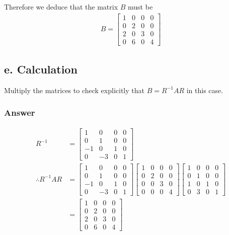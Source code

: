\documentclass{article}
\begin{document}
		Therefore we deduce that the matrix $B$ must be 
		\begin{align*}
		B=
		\begin{bmatrix}		
		1 & 0 & 0 & 0 \\
		0 & 2 & 0 & 0 \\
		2 & 0 & 3 & 0\\
		0 & 6 & 0 & 4
		\end{bmatrix}
		\end{align*}
		
		\subsection{e. Calculation}
		
		Multiply the matrices to check explicitly that $B=R^{-1}AR$ in this case.
		
		\subsubsection{Answer}
		
		\begin{align*}
		R^{-1}&=
		\begin{bmatrix}
		1 & 0 & 0 & 0\\
		0 & 1 & 0 & 0\\
		-1 & 0 & 1 & 0 \\
		0 &-3 & 0 & 1
		\end{bmatrix}\\
		\therefore R^{-1}AR &=
		\begin{bmatrix}
		1 & 0 & 0 & 0\\
		0 & 1 & 0 & 0\\
		-1 & 0 & 1 & 0 \\
		0 &-3 & 0 & 1
		\end{bmatrix}
		\begin{bmatrix}
		1 & 0 & 0 & 0\\
		0 & 2 & 0 & 0\\
		0 & 0 & 3 & 0\\
		0 & 0 & 0 & 4
		\end{bmatrix}
		\begin{bmatrix}
		1 & 0 & 0 & 0\\
		0 & 1 & 0 & 0\\
		1 & 0 & 1 & 0 \\
		0 &3 & 0 & 1
		\end{bmatrix}\\
		&=\begin{bmatrix}
		1 & 0 & 0 & 0\\
		0 & 2 & 0 & 0 \\
		2 & 0 & 3 & 0 \\
		0 & 6 & 0 & 4
		\end{bmatrix}		
		\end{align*}
		
\end{document}
